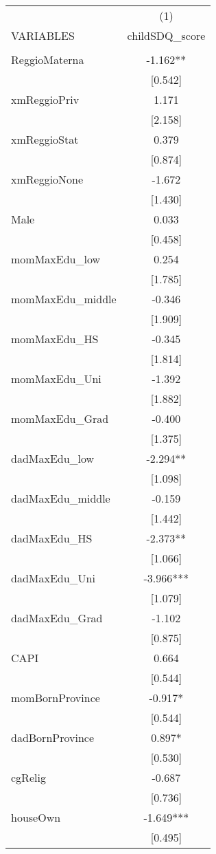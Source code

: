\documentclass[]{article}
\begin{document}
\begin{tabular}{lc} \hline
 & (1) \\
VARIABLES & childSDQ\_score \\ \hline
 &  \\
ReggioMaterna & -1.162** \\
 & [0.542] \\
xmReggioPriv & 1.171 \\
 & [2.158] \\
xmReggioStat & 0.379 \\
 & [0.874] \\
xmReggioNone & -1.672 \\
 & [1.430] \\
Male & 0.033 \\
 & [0.458] \\
momMaxEdu\_low & 0.254 \\
 & [1.785] \\
momMaxEdu\_middle & -0.346 \\
 & [1.909] \\
momMaxEdu\_HS & -0.345 \\
 & [1.814] \\
momMaxEdu\_Uni & -1.392 \\
 & [1.882] \\
momMaxEdu\_Grad & -0.400 \\
 & [1.375] \\
dadMaxEdu\_low & -2.294** \\
 & [1.098] \\
dadMaxEdu\_middle & -0.159 \\
 & [1.442] \\
dadMaxEdu\_HS & -2.373** \\
 & [1.066] \\
dadMaxEdu\_Uni & -3.966*** \\
 & [1.079] \\
dadMaxEdu\_Grad & -1.102 \\
 & [0.875] \\
CAPI & 0.664 \\
 & [0.544] \\
momBornProvince & -0.917* \\
 & [0.544] \\
dadBornProvince & 0.897* \\
 & [0.530] \\
cgRelig & -0.687 \\
 & [0.736] \\
houseOwn & -1.649*** \\
 & [0.495] \\

\end{tabular}
\end{document}
